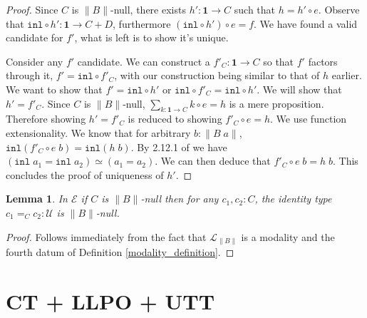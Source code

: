 \documentclass[12pt]{report}
\newtheorem{lem}[thm]{Lemma}
\theoremstyle{definition}
\begin{document}
\begin{proof}
Since $C$ is $\lVert B \rVert$-null, there exists $h' : \mathbf{1} \rightarrow C$ such that $h = h' \circ e$. 
Observe that $\mathtt{inl} \circ h' : \mathbf{1} \rightarrow C+D$, furthermore $(\mathtt{inl} \circ h') \circ e= f$. 
We have found a valid candidate for $f'$, what is left is to show it's unique. 

Consider any $f'$ candidate. 
We can construct a $f'_C : \mathbf{1} \rightarrow C$ so that $f'$ factors through it, $f' = \mathtt{inl} \circ f'_C$, with our construction being similar to that of $h$ earlier. 
We want to show that $f' = \mathtt{inl} \circ h'$ or $\mathtt{inl} \circ f'_C = \mathtt{inl} \circ h'$. 
We will show that $h' = f'_C$. 
Since $C$ is $\lVert B \rVert$-null, $\sum_{k : \mathbf{1} \rightarrow C} k \circ e = h$ is a mere proposition. 
Therefore showing $h' = f'_C$ is reduced to showing $f'_C \circ e = h$. 
We use function extensionality. 
We know that for arbitrary $b : \lVert B\; a \rVert$, $\mathtt{inl} (f'_C \circ e\; b ) = \mathtt{inl} (h\; b)$. 
By 2.12.1 of \cite{hottbook} we have $(\mathtt{inl}\; a_1 = \mathtt{inl}\; a_2) \simeq (a_1 = a_2)$. 
We can then deduce that $f'_C\circ e\; b = h\; b$. This concludes the proof of uniqueness of $h'$.

\end{proof}

\begin{lem}
In $\mathcal{E}$ if $C$ is $\lVert B \rVert$-null then for any $c_1, c_2 : C$, the identity type $c_1=_C c_2 : \mathcal{U}$ is $\lVert B\rVert$-null. 
\end{lem}
\begin{proof}
Follows immediately from the fact that $\mathcal{L}_{\lVert B \rVert}$ is a modality and the fourth datum of Definition \ref{modality_definition}.
\end{proof}

\section{CT + LLPO + UTT}
\end{document}
